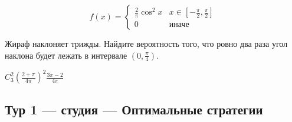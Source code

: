 \documentclass[12pt]{article}
\newenvironment{problem}{}{}
\newenvironment{sol}{}{} %
\begin{document}
\begin{enumerate}
\begin{problem}
\[
f(x) = \begin{cases}
\frac{2}{\pi} \cos^2 x & x \in \left[-\frac{\pi}{2}, \frac{\pi}{2}\right] \\
0 & \text{иначе}
\end{cases}
\]

Жираф наклоняет трижды. Найдите вероятность того, что ровно два раза угол наклона будет лежать в интервале $\left(0, \frac{\pi}{4}\right)$.

\begin{sol}
$C_3^2 \left(\frac{2+\pi}{4\pi}\right)^2 \frac{3\pi-2}{4\pi}$
\end{sol}
\end{problem}
\end{enumerate}


\newpage
\subsection{Тур 1 — студия — Оптимальные стратегии}
\end{document}
